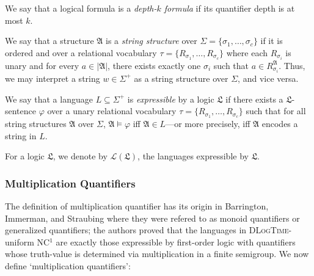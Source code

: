 \documentclass[a4paper,UKenglish,cleveref, autoref, thm-restate, anonymous]{lipics-v2021}
\begin{document}
\begin{definition}
    We say that a logical formula is a \emph{depth-$k$ formula} if its quantifier depth is at most $k$.
\end{definition}


\begin{definition}
    We say that a structure $\mathfrak{A}$ is a \emph{string structure} over $\Sigma = \{\sigma_1, \dots, \sigma_c\}$ if it is ordered and over a relational vocabulary $\tau = \{R_{\sigma_1}, \dots, R_{\sigma_c}\}$ where each $R_{\sigma_i}$ is unary and for every $a \in |\mathfrak{A}|$, there exists exactly one $\sigma_i$ such that $a \in R_{\sigma_i}^\mathfrak{A}$. Thus, we may interpret a string $w \in \Sigma^+$ as a string structure over $\Sigma$, and vice versa.

    We say that a language $L \subseteq \Sigma^+$ is \emph{expressible} by a logic $\mathfrak{L}$ if there exists a $\mathfrak{L}$-sentence $\varphi$ over a unary relational vocabulary $\tau = \{R_{\sigma_1}, \dots, R_{\sigma_c}\}$ such that for all string structures $\mathfrak{A}$ over $\Sigma$, $\mathfrak{A} \models \varphi$ iff $\mathfrak{A} \in L$---or more precisely, iff $\mathfrak{A}$ encodes a string in $L$.
    
    For a logic $\mathfrak{L}$, we denote by $\mathcal{L}(\mathfrak{L})$, the languages expressible by $\mathfrak{L}$.
\end{definition}

\subsubsection{Multiplication Quantifiers}\label{sec:backgroundmult}

The definition of multiplication quantifier has its origin in Barrington, Immerman, and Straubing \cite[Section 5]{barrington1990uniformity} where they were refered to as monoid quantifiers or generalized quantifiers; the authors proved that the languages in \textsc{DLogTime}-uniform NC${}^1$ are exactly those expressible by first-order logic with quantifiers whose truth-value is determined via multiplication in a finite semigroup. We now define `multiplication quantifiers':
\end{document}
